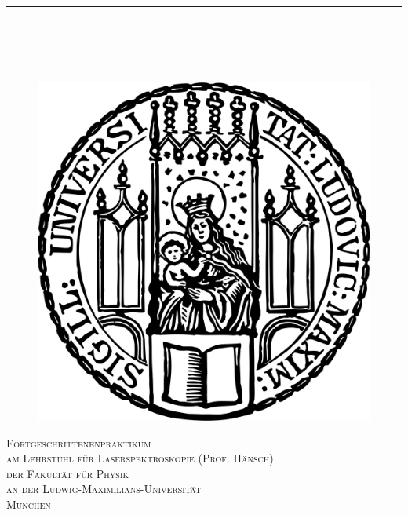 \begin{titlepage}   

   {\sffamily
    {\parindent0cm
    \rule{\linewidth}{.4ex}}  
  \begin{center}
    {\Huge \bfseries \getTitle{}}
    
    \vspace*{2ex}
    {\Large \bfseries -- \getSubtitle{} --}
    
    {\large\bfseries \getAuthorOne{}\\}
    {\large\bfseries \getAuthorTwo{}}
    
  \end{center}
    \rule{\linewidth}{.4ex}
    
  \begin{figure}[!h]
    \centering
    \includegraphics[scale = 0.1]{figures/lmu-siegel.png}
  \end{figure}
    
  \begin{center}
    {\large \scshape Fortgeschrittenenpraktikum\\
     am Lehrstuhl für Laserspektroskopie (Prof. Hänsch)\\
     der Fakultät für Physik\\
     an der Ludwig-Maximilians-Universität\\
     München}
  \end{center}
   }
\end{titlepage}

\cleardoublepage
